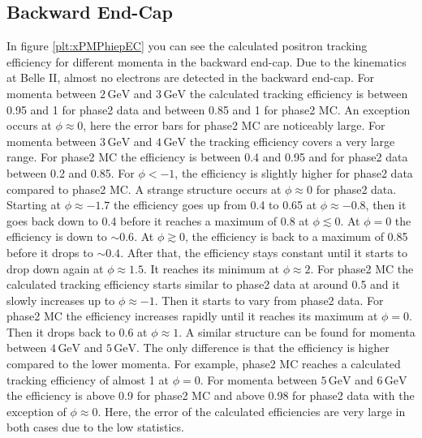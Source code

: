 \documentclass[a4paper,11pt,twosided,final,german,openbib,pdftex,listof=totoc,bibliography=totoc]{scrbook}
\begin{document}
\newpage
\subsection{Backward End-Cap}
\label{sec:MEC}

In figure \ref{plt:xPMPhiepEC} you can see the calculated positron tracking efficiency for different momenta in the backward end-cap. 
Due to the kinematics at Belle II, almost no electrons are detected in the backward end-cap. For momenta between $2\,\textrm{GeV}$ and $3\,\textrm{GeV}$ the calculated tracking efficiency is between 0.95 and 1 for phase2 data and between 0.85 and 1 for phase2 MC. An exception occurs at $\phi \approx 0$, here the error bars for phase2 MC are noticeably large. 
For momenta between $3\,\textrm{GeV}$ and $4\,\textrm{GeV}$ the tracking efficiency covers a very large range. For phase2 MC the efficiency is between 0.4 and 0.95 and for phase2 data between 0.2 and 0.85. For $\phi <  -1$, the efficiency is slightly higher for phase2 data compared to phase2 MC. 
A strange structure occurs at $\phi \approx 0$ for phase2 data. Starting at  $\phi \approx -1.7$ the efficiency goes up from 0.4 to 0.65 at $\phi \approx -0.8$, then it goes back down to 0.4 before it reaches a maximum of 0.8 at $\phi \lesssim 0$.
At $\phi =0$ the efficiency is down to $\sim 0.6$. At $\phi \gtrsim 0$, the efficiency is back to a maximum of 0.85 before it drops to $\sim 0.4$.
After that, the efficiency stays constant until it starts to drop down again at $\phi \approx 1.5$. It reaches its minimum at $\phi \approx 2$.
For phase2 MC the calculated tracking efficiency starts similar to phase2 data at around 0.5 and it slowly increases up to $\phi \approx -1$. Then it starts to vary from phase2 data. For phase2 MC the efficiency  increases rapidly until it reaches its maximum at $\phi = 0$. Then it drops back to 0.6 at $\phi \approx 1$.
A similar structure can be found for momenta between $4\,\textrm{GeV}$ and $5\,\textrm{GeV}$. The only difference is that the efficiency is higher compared to the lower momenta. For example, phase2 MC reaches a calculated tracking efficiency of almost 1 at $\phi =0$.
For momenta between $5\,\textrm{GeV}$ and $6\,\textrm{GeV}$ the efficiency is above 0.9 for  phase2 MC and above 0.98 for phase2 data with the exception of $\phi \approx 0$. Here, the error of the calculated efficiencies are very large in both cases due to the low statistics.
\end{document}
